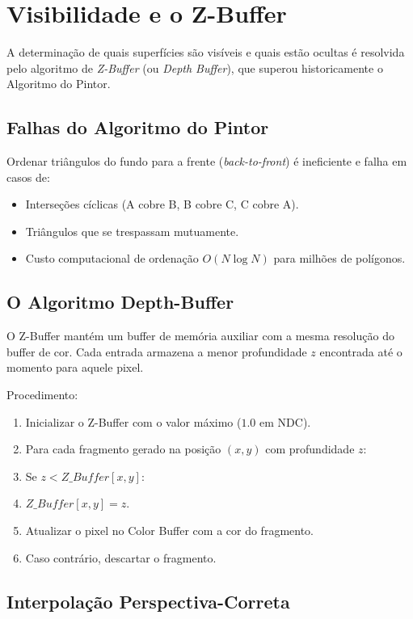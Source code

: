 \section{Visibilidade e o Z-Buffer}

A determinação de quais superfícies são visíveis e quais estão ocultas é resolvida pelo algoritmo de \textit{Z-Buffer} (ou \textit{Depth Buffer}), que superou historicamente o Algoritmo do Pintor.

\subsection{Falhas do Algoritmo do Pintor}

Ordenar triângulos do fundo para a frente (\textit{back-to-front}) é ineficiente e falha em casos de:
\begin{itemize}
    \item Interseções cíclicas (A cobre B, B cobre C, C cobre A).
    \item Triângulos que se trespassam mutuamente.
    \item Custo computacional de ordenação $O(N \log N)$ para milhões de polígonos.
\end{itemize}

\subsection{O Algoritmo Depth-Buffer}

O Z-Buffer mantém um buffer de memória auxiliar com a mesma resolução do buffer de cor. Cada entrada armazena a menor profundidade $z$ encontrada até o momento para aquele pixel.

Procedimento:
\begin{enumerate}
    \item Inicializar o Z-Buffer com o valor máximo ($1.0$ em NDC).
    \item Para cada fragmento gerado na posição $(x, y)$ com profundidade $z$:
    \item Se $z < Z\_Buffer[x, y]$:
        \item $Z\_Buffer[x, y] = z$.
        \item Atualizar o pixel no Color Buffer com a cor do fragmento.
    \item Caso contrário, descartar o fragmento.
\end{enumerate}

\subsection{Interpolação Perspectiva-Correta}

